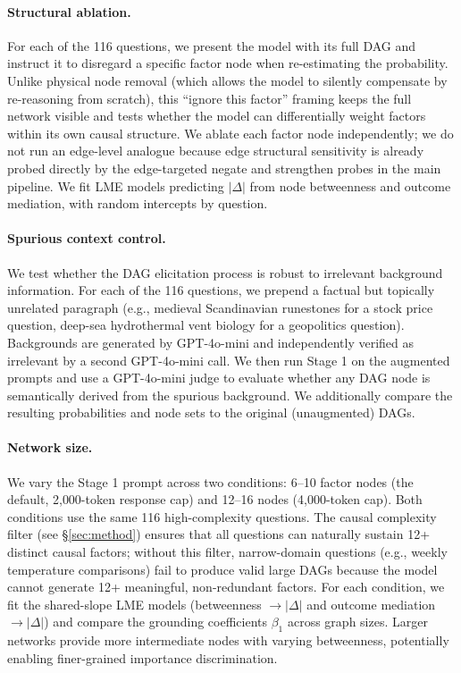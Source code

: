 \documentclass[11pt]{article}
\begin{document}
\paragraph{Structural ablation.} For each of the 116 questions, we present the model with its full DAG and instruct it to disregard a specific factor node when re-estimating the probability. Unlike physical node removal (which allows the model to silently compensate by re-reasoning from scratch), this ``ignore this factor'' framing keeps the full network visible and tests whether the model can differentially weight factors within its own causal structure. We ablate each factor node independently; we do not run an edge-level analogue because edge structural sensitivity is already probed directly by the edge-targeted negate and strengthen probes in the main pipeline. We fit LME models predicting $|\Delta|$ from node betweenness and outcome mediation, with random intercepts by question.

\paragraph{Spurious context control.} We test whether the DAG elicitation process is robust to irrelevant background information. For each of the 116 questions, we prepend a factual but topically unrelated paragraph (e.g., medieval Scandinavian runestones for a stock price question, deep-sea hydrothermal vent biology for a geopolitics question). Backgrounds are generated by GPT-4o-mini and independently verified as irrelevant by a second GPT-4o-mini call. We then run Stage 1 on the augmented prompts and use a GPT-4o-mini judge to evaluate whether any DAG node is semantically derived from the spurious background. We additionally compare the resulting probabilities and node sets to the original (unaugmented) DAGs.

\paragraph{Network size.} We vary the Stage 1 prompt across two conditions: 6--10 factor nodes (the default, 2{,}000-token response cap) and 12--16 nodes (4{,}000-token cap). Both conditions use the same 116 high-complexity questions. The causal complexity filter (see \S\ref{sec:method}) ensures that all questions can naturally sustain 12+ distinct causal factors; without this filter, narrow-domain questions (e.g., weekly temperature comparisons) fail to produce valid large DAGs because the model cannot generate 12+ meaningful, non-redundant factors. For each condition, we fit the shared-slope LME models (betweenness $\rightarrow |\Delta|$ and outcome mediation $\rightarrow |\Delta|$) and compare the grounding coefficients $\beta_1$ across graph sizes. Larger networks provide more intermediate nodes with varying betweenness, potentially enabling finer-grained importance discrimination.
\end{document}
